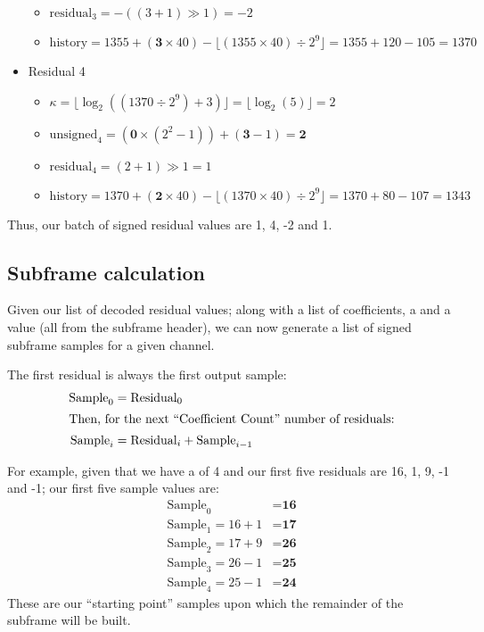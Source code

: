 \begin{itemize}
\begin{itemize}
\item $\text{residual}_3 = -((3 + 1) \gg 1) = -2$
\item $\text{history} = 1355 + (\textbf{3} \times 40) - \lfloor(1355 \times 40) \div 2^9\rfloor = 1355 + 120 - 105 = 1370$
\end{itemize}
\item Residual 4
\begin{itemize}
\item $\kappa = \lfloor\log_2((1370 \div 2^9) + 3)\rfloor = \lfloor\log_2(5)\rfloor = 2$
\item $\text{unsigned}_4 = (\textbf{0} \times (2^2 - 1)) + (\textbf{3} - 1) = \textbf{2}$
\item $\text{residual}_4 = (2 + 1) \gg 1 = 1$
\item $\text{history} = 1370 + (\textbf{2} \times 40) - \lfloor(1370 \times 40) \div 2^9\rfloor = 1370 + 80 - 107 = 1343$
\end{itemize}
\end{itemize}
Thus, our batch of signed residual values are 1, 4, -2 and 1.

\clearpage

\subsection{Subframe calculation}


Given our list of decoded residual values;
along with a list of coefficients,
a  and a  value
(all from the subframe header),
we can now generate a list of signed subframe samples for a
given channel.

The first residual is always the first output sample:
\begin{align*}
\text{Sample}_0 &= \text{Residual}_0 \\
\intertext{Then, for the next ``{Coefficient Count}'' number of residuals:}
\text{Sample}_i &= \text{Residual}_i + \text{Sample}_{i - 1}
\end{align*}

For example, given that we have a  of 4
and our first five residuals are 16, 1, 9, -1 and -1;
our first five sample values are:
\begin{align*}
\text{Sample}_0 &= \textbf{16} \\
\text{Sample}_1 = 16 + 1 &= \textbf{17} \\
\text{Sample}_2 = 17 + 9 &= \textbf{26} \\
\text{Sample}_3 = 26 - 1 &= \textbf{25} \\
\text{Sample}_4 = 25 - 1 &= \textbf{24}
\end{align*}
These are our ``starting point'' samples upon which the remainder
of the subframe will be built.
